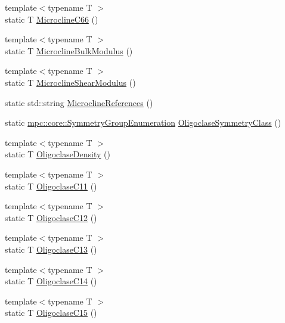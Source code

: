 \begin{DoxyCompactItemize}
\item 
{\footnotesize template$<$typename T $>$ }\\static T \mbox{\hyperlink{namespacempc_1_1data_a719804c10995fe2c854c3579f13c049d}{Microcline\+C66}} ()
\item 
{\footnotesize template$<$typename T $>$ }\\static T \mbox{\hyperlink{namespacempc_1_1data_aea7ff85eee5f8c08daa2931e1d0b6377}{Microcline\+Bulk\+Modulus}} ()
\item 
{\footnotesize template$<$typename T $>$ }\\static T \mbox{\hyperlink{namespacempc_1_1data_a04b72339e0f03a2342bc8c6efca3df99}{Microcline\+Shear\+Modulus}} ()
\item 
static std\+::string \mbox{\hyperlink{namespacempc_1_1data_a0ab9d86c799823bd41134c22ad89ba84}{Microcline\+References}} ()
\item 
static \mbox{\hyperlink{namespacempc_1_1core_a9d979684062547055a0ef5c13077bad8}{mpc\+::core\+::\+Symmetry\+Group\+Enumeration}} \mbox{\hyperlink{namespacempc_1_1data_a9fc60081a5638a22ddb9ad2b2aad862b}{Oligoclase\+Symmetry\+Class}} ()
\item 
{\footnotesize template$<$typename T $>$ }\\static T \mbox{\hyperlink{namespacempc_1_1data_a7f28bb1bdc093d48e2638d4246104135}{Oligoclase\+Density}} ()
\item 
{\footnotesize template$<$typename T $>$ }\\static T \mbox{\hyperlink{namespacempc_1_1data_adb6a90263167f5afdd52570544c1b6b9}{Oligoclase\+C11}} ()
\item 
{\footnotesize template$<$typename T $>$ }\\static T \mbox{\hyperlink{namespacempc_1_1data_ab4e3433fbf2cceafeea716ad422a21f5}{Oligoclase\+C12}} ()
\item 
{\footnotesize template$<$typename T $>$ }\\static T \mbox{\hyperlink{namespacempc_1_1data_acfba49131f71114b663855f35e5742c0}{Oligoclase\+C13}} ()
\item 
{\footnotesize template$<$typename T $>$ }\\static T \mbox{\hyperlink{namespacempc_1_1data_a67b0cc1dfb47b2061a5baf413dbc30c1}{Oligoclase\+C14}} ()
\item 
{\footnotesize template$<$typename T $>$ }\\static T \mbox{\hyperlink{namespacempc_1_1data_abcbe10af9afd5b4426e95cc26205c611}{Oligoclase\+C15}} ()
\item 

\end{DoxyCompactItemize}
